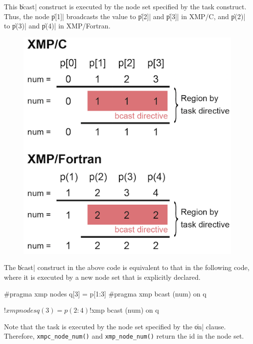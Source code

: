 
This \|bcast| construct is executed by the node set specified by the task
construct. Thus, the node \|p[1]| broadcasts the value to \|p[2]| and
\|p[3]| in XMP/C, and \|p(2)| to \|p(3)| and \|p(4)| in XMP/Fortran.

\begin{figure}
  \centering
  \includegraphics{figs/task.png}
\end{figure}

The \|bcast| construct in the above code is equivalent to that in the
following code, where it is executed by a new node set that is
explicitly declared.

\begin{XCexample}
#pragma xmp nodes q[3] = p[1:3]
#pragma xmp bcast (num) on q
\end{XCexample}

\begin{XFexample}
!$xmp nodes q(3) = p(2:4)
!$xmp bcast (num) on q
\end{XFexample}

Note that the task is executed by the node set specified by the \|on|
clause. Therefore, {\tt xmpc\_node\_num()} and {\tt xmp\_node\_num()}
return the id in the node set.

